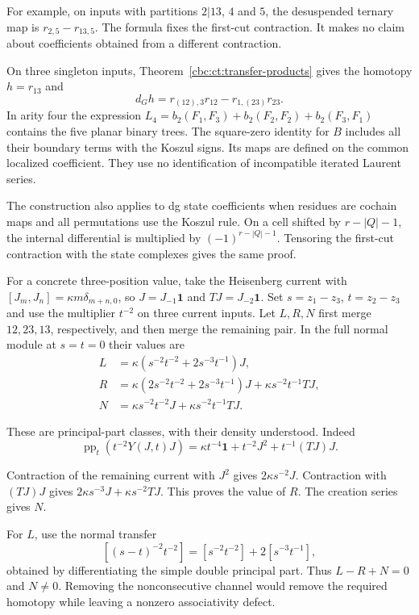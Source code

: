 For example, on inputs with partitions $2|13$, $4$ and $5$,
the desuspended ternary map is $r_{2,5}-r_{13,5}$.
The formula fixes the first-cut contraction. It makes no claim
about coefficients obtained from a different contraction.

On three singleton inputs, Theorem~\ref{cbc:ct:transfer-products}
gives the homotopy $h=r_{13}$ and
\[
 d_Gh=r_{(12),3}r_{12}-r_{1,(23)}r_{23}.
\]
In arity four the expression
$L_4=b_2(F_1,F_3)+b_2(F_2,F_2)+b_2(F_3,F_1)$ contains
the five planar binary trees. The square-zero identity for $B$
includes all their boundary terms with the Koszul signs. Its
maps are defined on the common localized coefficient. They use
no identification of incompatible iterated Laurent series.

The construction also applies to dg state coefficients when
residues are cochain maps and all permutations use the Koszul
rule. On a cell shifted by $r-|Q|-1$, the internal differential
is multiplied by $(-1)^{r-|Q|-1}$. Tensoring the first-cut
contraction with the state complexes gives the same proof.

For a concrete three-position value, take the Heisenberg current
with $[J_m,J_n]=\kappa m\delta_{m+n,0}$, so
$J=J_{-1}\mathbf1$ and $TJ=J_{-2}\mathbf1$. Set
$s=z_1-z_3$, $t=z_2-z_3$ and use the multiplier $t^{-2}$
on three current inputs. Let $L,R,N$ first merge $12,23,13$,
respectively, and then merge the remaining pair. In the full
normal module at $s=t=0$ their values are
\begin{align*}
 L&=\kappa(s^{-2}t^{-2}+2s^{-3}t^{-1})J,\\
 R&=\kappa(2s^{-2}t^{-2}+2s^{-3}t^{-1})J
                         +\kappa s^{-2}t^{-1}TJ,\\
 N&=\kappa s^{-2}t^{-2}J+\kappa s^{-2}t^{-1}TJ.
\end{align*}

These are principal-part classes, with their density understood.
Indeed
\[
 \operatorname{pp}_t(t^{-2}Y(J,t)J)
    =\kappa t^{-4}\mathbf1+t^{-2}J^2+t^{-1}(TJ)J.
\]

Contraction of the remaining current with $J^2$ gives
$2\kappa s^{-2}J$. Contraction with $(TJ)J$ gives
$2\kappa s^{-3}J+\kappa s^{-2}TJ$. This proves the value
of $R$. The creation series gives $N$.

For $L$, use the
normal transfer
\[
 [(s-t)^{-2}t^{-2}]=[s^{-2}t^{-2}]+2[s^{-3}t^{-1}],
\]
obtained by differentiating the simple double principal part.
Thus $L-R+N=0$ and $N\ne0$. Removing the nonconsecutive
channel would remove the required homotopy while leaving a
nonzero associativity defect.

